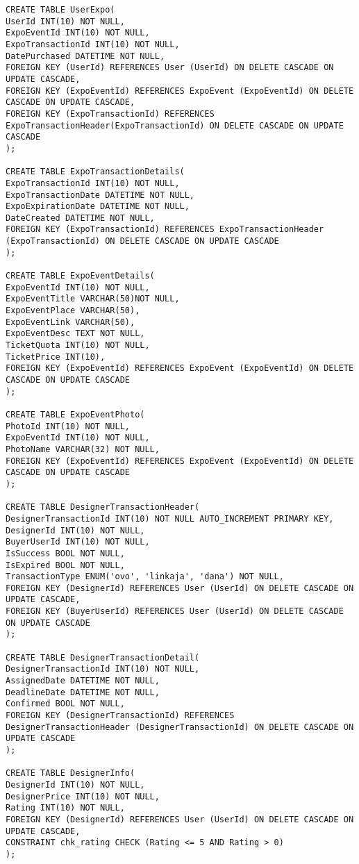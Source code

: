 \begin{lstlisting}
CREATE TABLE UserExpo(
UserId INT(10) NOT NULL,
ExpoEventId INT(10) NOT NULL,
ExpoTransactionId INT(10) NOT NULL,
DatePurchased DATETIME NOT NULL,
FOREIGN KEY (UserId) REFERENCES User (UserId) ON DELETE CASCADE ON UPDATE CASCADE,
FOREIGN KEY (ExpoEventId) REFERENCES ExpoEvent (ExpoEventId) ON DELETE CASCADE ON UPDATE CASCADE,
FOREIGN KEY (ExpoTransactionId) REFERENCES ExpoTransactionHeader(ExpoTransactionId) ON DELETE CASCADE ON UPDATE CASCADE
); 

CREATE TABLE ExpoTransactionDetails(
ExpoTransactionId INT(10) NOT NULL,
ExpoTransactionDate DATETIME NOT NULL,
ExpoExpirationDate DATETIME NOT NULL,
DateCreated DATETIME NOT NULL,
FOREIGN KEY (ExpoTransactionId) REFERENCES ExpoTransactionHeader (ExpoTransactionId) ON DELETE CASCADE ON UPDATE CASCADE
);

CREATE TABLE ExpoEventDetails(
ExpoEventId INT(10) NOT NULL,
ExpoEventTitle VARCHAR(50)NOT NULL,
ExpoEventPlace VARCHAR(50),
ExpoEventLink VARCHAR(50),
ExpoEventDesc TEXT NOT NULL,
TicketQuota INT(10) NOT NULL,
TicketPrice INT(10),
FOREIGN KEY (ExpoEventId) REFERENCES ExpoEvent (ExpoEventId) ON DELETE CASCADE ON UPDATE CASCADE
);

CREATE TABLE ExpoEventPhoto(
PhotoId INT(10) NOT NULL,
ExpoEventId INT(10) NOT NULL,
PhotoName VARCHAR(32) NOT NULL,
FOREIGN KEY (ExpoEventId) REFERENCES ExpoEvent (ExpoEventId) ON DELETE CASCADE ON UPDATE CASCADE
);

CREATE TABLE DesignerTransactionHeader(
DesignerTransactionId INT(10) NOT NULL AUTO_INCREMENT PRIMARY KEY,
DesignerId INT(10) NOT NULL,
BuyerUserId INT(10) NOT NULL,
IsSuccess BOOL NOT NULL,
IsExpired BOOL NOT NULL,
TransactionType ENUM('ovo', 'linkaja', 'dana') NOT NULL,
FOREIGN KEY (DesignerId) REFERENCES User (UserId) ON DELETE CASCADE ON UPDATE CASCADE,
FOREIGN KEY (BuyerUserId) REFERENCES User (UserId) ON DELETE CASCADE ON UPDATE CASCADE
);

CREATE TABLE DesignerTransactionDetail(
DesignerTransactionId INT(10) NOT NULL,
AssignedDate DATETIME NOT NULL,
DeadlineDate DATETIME NOT NULL,
Confirmed BOOL NOT NULL,
FOREIGN KEY (DesignerTransactionId) REFERENCES DesignerTransactionHeader (DesignerTransactionId) ON DELETE CASCADE ON UPDATE CASCADE
);  

CREATE TABLE DesignerInfo(
DesignerId INT(10) NOT NULL,
DesignerPrice INT(10) NOT NULL,
Rating INT(10) NOT NULL,
FOREIGN KEY (DesignerId) REFERENCES User (UserId) ON DELETE CASCADE ON UPDATE CASCADE,
CONSTRAINT chk_rating CHECK (Rating <= 5 AND Rating > 0)
);


\end{lstlisting}
